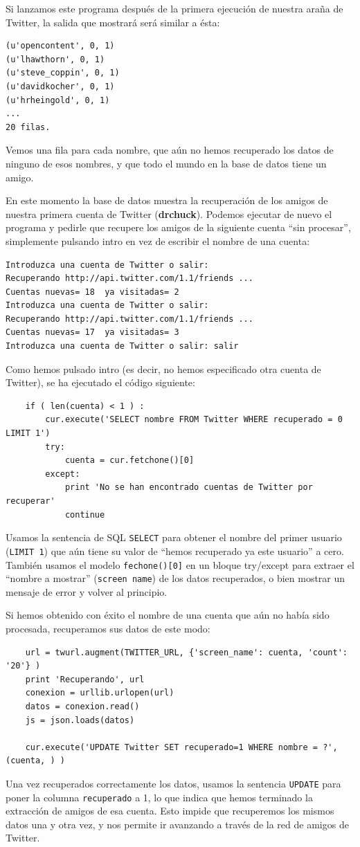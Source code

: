 Si lanzamos este programa después de la primera ejecución de nuestra araña
de Twitter, la salida que mostrará será similar a ésta:

\beforeverb
\begin{verbatim}
(u'opencontent', 0, 1)
(u'lhawthorn', 0, 1)
(u'steve_coppin', 0, 1)
(u'davidkocher', 0, 1)
(u'hrheingold', 0, 1)
...
20 filas.
\end{verbatim}
\afterverb
%
Vemos una fila para cada nombre, que aún no hemos
recuperado los datos de ninguno de esos nombres, y
que todo el mundo en la base de datos tiene un amigo.

En este momento la base de datos muestra la recuperación de los amigos de
nuestra primera cuenta de Twitter ({\bf drchuck}). Podemos ejecutar de nuevo
el programa y pedirle que recupere los amigos de la siguiente
cuenta ``sin procesar'', simplemente pulsando intro en vez de
escribir el nombre de una cuenta:

\beforeverb
\begin{verbatim}
Introduzca una cuenta de Twitter o salir:  
Recuperando http://api.twitter.com/1.1/friends ...
Cuentas nuevas= 18  ya visitadas= 2
Introduzca una cuenta de Twitter o salir: 
Recuperando http://api.twitter.com/1.1/friends ...
Cuentas nuevas= 17  ya visitadas= 3
Introduzca una cuenta de Twitter o salir: salir
\end{verbatim}
\afterverb
%
Como hemos pulsado intro (es decir, no hemos especificado otra cuenta de Twitter),
se ha ejecutado el código siguiente:

\beforeverb
\begin{verbatim}
    if ( len(cuenta) < 1 ) :
        cur.execute('SELECT nombre FROM Twitter WHERE recuperado = 0 LIMIT 1')
        try:
            cuenta = cur.fetchone()[0]
        except:
            print 'No se han encontrado cuentas de Twitter por recuperar'
            continue
\end{verbatim}
\afterverb
%
Usamos la sentencia de SQL {\tt SELECT} para obtener el nombre del primer
usuario ({\tt LIMIT 1}) que aún tiene su valor de ``hemos recuperado ya este usuario''
a cero. También usamos el modelo {\tt fechone()[0]} en un bloque
try/except para extraer el ``nombre a mostrar'' ({\tt screen name}) de los datos recuperados,
o bien mostrar un mensaje de error y volver al principio.

Si hemos obtenido con éxito el nombre de una cuenta que aún no había sido procesada,
recuperamos sus datos de este modo:

\beforeverb
\begin{verbatim}
    url = twurl.augment(TWITTER_URL, {'screen_name': cuenta, 'count': '20'} )
    print 'Recuperando', url
    conexion = urllib.urlopen(url)
    datos = conexion.read()
    js = json.loads(datos)

    cur.execute('UPDATE Twitter SET recuperado=1 WHERE nombre = ?', (cuenta, ) )
\end{verbatim}
\afterverb
%
Una vez recuperados correctamente los datos, usamos la sentencia {\tt UPDATE}
para poner la columna {\tt recuperado} a 1, lo que indica que hemos terminado
la extracción de amigos de esa cuenta. Esto impide que recuperemos los
mismos datos una y otra vez, y nos permite ir avanzando a través de la red
de amigos de Twitter. 

